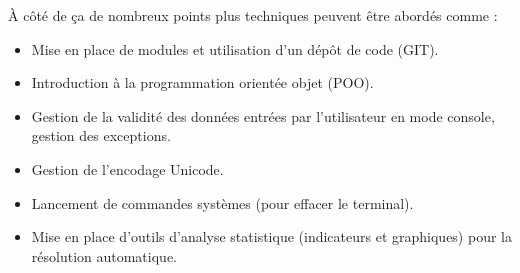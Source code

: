 À côté de ça de nombreux points plus techniques peuvent être abordés comme :
\begin{itemize}
\item Mise en place de modules et utilisation d'un dépôt de code (GIT).
\item Introduction à la programmation orientée objet (POO).
\item Gestion de la validité des données entrées par l'utilisateur en mode console, gestion des exceptions.
\item Gestion de l'encodage Unicode.
\item Lancement de commandes systèmes (pour effacer le terminal).
\item Mise en place d'outils d'analyse statistique (indicateurs et graphiques) pour la résolution automatique.

\end{itemize}


